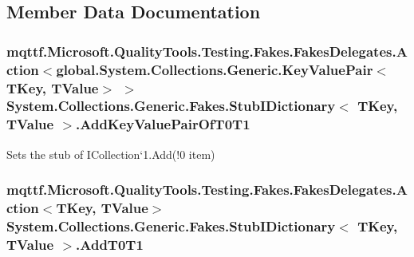 \subsection{Member Data Documentation}
\hypertarget{class_system_1_1_collections_1_1_generic_1_1_fakes_1_1_stub_i_dictionary_3_01_t_key_00_01_t_value_01_4_a50387b80519c420b78cc030fb6c2a9dd}{
\subsubsection[{Add\-Key\-Value\-Pair\-Of\-T0\-T1}]{\setlength{\rightskip}{0pt plus 5cm}mqttf.\-Microsoft.\-Quality\-Tools.\-Testing.\-Fakes.\-Fakes\-Delegates.\-Action$<$global.\-System.\-Collections.\-Generic.\-Key\-Value\-Pair$<$T\-Key, T\-Value$>$ $>$ System.\-Collections.\-Generic.\-Fakes.\-Stub\-I\-Dictionary$<$ T\-Key, T\-Value $>$.Add\-Key\-Value\-Pair\-Of\-T0\-T1}}\label{class_system_1_1_collections_1_1_generic_1_1_fakes_1_1_stub_i_dictionary_3_01_t_key_00_01_t_value_01_4_a50387b80519c420b78cc030fb6c2a9dd}


Sets the stub of I\-Collection`1.Add(!0 item)

\hypertarget{class_system_1_1_collections_1_1_generic_1_1_fakes_1_1_stub_i_dictionary_3_01_t_key_00_01_t_value_01_4_aa20d657a60f5a11654955164e0560496}{
\subsubsection[{Add\-T0\-T1}]{\setlength{\rightskip}{0pt plus 5cm}mqttf.\-Microsoft.\-Quality\-Tools.\-Testing.\-Fakes.\-Fakes\-Delegates.\-Action$<$T\-Key, T\-Value$>$ System.\-Collections.\-Generic.\-Fakes.\-Stub\-I\-Dictionary$<$ T\-Key, T\-Value $>$.Add\-T0\-T1}}\label{class_system_1_1_collections_1_1_generic_1_1_fakes_1_1_stub_i_dictionary_3_01_t_key_00_01_t_value_01_4_aa20d657a60f5a11654955164e0560496}


